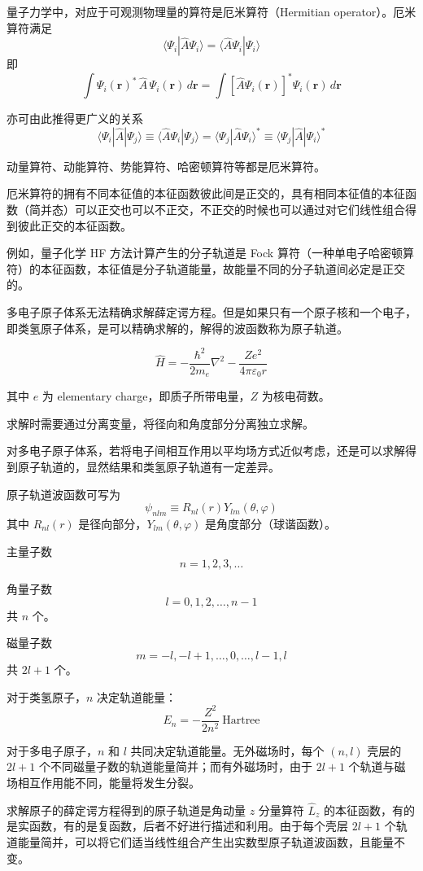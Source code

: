 量子力学中，对应于可观测物理量的算符是厄米算符（Hermitian operator）。厄米算符满足
\[
\langle \Psi_i|\hat A\Psi_i\rangle=\langle \hat A\Psi_i|\Psi_i\rangle
\]
即
\[
\int \Psi_i(\mathbf r)^*\,\hat A\,\Psi_i(\mathbf r)\,d\mathbf r
=
\int [\hat A\Psi_i(\mathbf r)]^*\Psi_i(\mathbf r)\,d\mathbf r
\]

亦可由此推得更广义的关系
\[
\langle \Psi_i|\hat A|\Psi_j\rangle
\equiv
\langle \hat A\Psi_i|\Psi_j\rangle
=
\langle \Psi_j|\hat A\Psi_i\rangle^*
\equiv
\langle \Psi_j|\hat A|\Psi_i\rangle^*
\]

动量算符、动能算符、势能算符、哈密顿算符等都是厄米算符。

厄米算符的拥有不同本征值的本征函数彼此间是正交的，具有相同本征值的本征函数（简并态）可以正交也可以不正交，不正交的时候也可以通过对它们线性组合得到彼此正交的本征函数。

例如，量子化学 HF 方法计算产生的分子轨道是 Fock 算符（一种单电子哈密顿算符）的本征函数，本征值是分子轨道能量，故能量不同的分子轨道间必定是正交的。

多电子原子体系无法精确求解薛定谔方程。但是如果只有一个原子核和一个电子，即类氢原子体系，是可以精确求解的，解得的波函数称为原子轨道。

\[
\hat H=-\frac{\hbar^2}{2m_e}\nabla^2-\frac{Ze^2}{4\pi\varepsilon_0 r}
\]

其中 $e$ 为 elementary charge，即质子所带电量，$Z$ 为核电荷数。

求解时需要通过分离变量，将径向和角度部分分离独立求解。

对多电子原子体系，若将电子间相互作用以平均场方式近似考虑，还是可以求解得到原子轨道的，显然结果和类氢原子轨道有一定差异。

原子轨道波函数可写为
\[
\psi_{nlm}\equiv R_{nl}(r)Y_{lm}(\theta,\varphi)
\]
其中 $R_{nl}(r)$ 是径向部分，$Y_{lm}(\theta,\varphi)$ 是角度部分（球谐函数）。

主量子数
\[
n=1,2,3,\ldots
\]

角量子数
\[
l=0,1,2,\ldots,n-1
\]
共 $n$ 个。

磁量子数
\[
m=-l,-l+1,\ldots,0,\ldots,l-1,l
\]
共 $2l+1$ 个。

对于类氢原子，$n$ 决定轨道能量：
\[
E_n=-\frac{Z^2}{2n^2}\ \text{Hartree}
\]

对于多电子原子，$n$ 和 $l$ 共同决定轨道能量。无外磁场时，每个 $(n,l)$ 壳层的 $2l+1$ 个不同磁量子数的轨道能量简并；而有外磁场时，由于 $2l+1$ 个轨道与磁场相互作用能不同，能量将发生分裂。

求解原子的薛定谔方程得到的原子轨道是角动量 $z$ 分量算符 $\hat L_z$ 的本征函数，有的是实函数，有的是复函数，后者不好进行描述和利用。由于每个壳层 $2l+1$ 个轨道能量简并，可以将它们适当线性组合产生出实数型原子轨道波函数，且能量不变。

